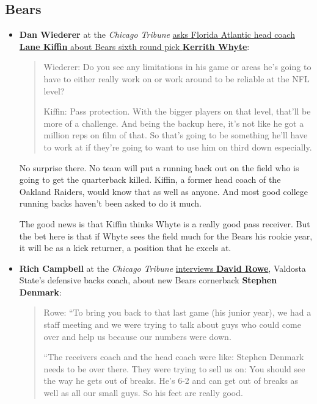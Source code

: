 \documentclass[11pt]{article}
\author{Tom Shannon}
\date{\today}
\title{}
\begin{document}
\subsection{Bears}
\begin{itemize}
\item  \textbf{Dan Wiederer} at the \textit{Chicago Tribune} \href{https://www.chicagotribune.com/sports/bears/ct-spt-bears-kerrith-whyte-lane-kiffin-20190514-story.html}{asks Florida Atlantic head coach \textbf{Lane Kiffin} about Bears sixth round pick \textbf{Kerrith Whyte}}:

\begin{quote}
Wiederer: Do you see any limitations in his game or areas he’s going to have to either really work on or work around to be reliable at the NFL level?

Kiffin:  Pass protection. With the bigger players on that level, that’ll be more of a challenge. And being the backup here, it’s not like he got a million reps on film of that. So that’s going to be something he’ll have to work at if they’re going to want to use him on third down especially.
\end{quote}

No surprise there.  No team will put a running back out on the field who is going to get the quarterback killed.  Kiffin, a former head coach of the Oakland Raiders, would know that as well as anyone.  And most good college running backs haven't been asked to do it much. 

The good news is that Kiffin thinks Whyte is a really good pass receiver.  But the bet here is that if Whyte sees the field much for the Bears his rookie year, it will be as a kick returner, a position that he excels at.

\item \textbf{Rich Campbell} at the \textit{Chicago Tribune} \href{https://www.chicagotribune.com/sports/bears/ct-spt-bears-stephen-denmark-valdosta-state-20190513-story.html}{interviews \textbf{David Rowe}}, Valdosta State's defensive backs coach, about new Bears cornerback \textbf{Stephen Denmark}:

\begin{quote}
Rowe:  ``To bring you back to that last game (his junior year), we had a staff meeting and we were trying to talk about guys who could come over and help us because our numbers were down.

``The receivers coach and the head coach were like: Stephen Denmark needs to be over there. They were trying to sell us on: You should see the way he gets out of breaks. He’s 6-2 and can get out of breaks as well as all our small guys. So his feet are really good.


\end{quote}
\end{itemize}
\end{document}
